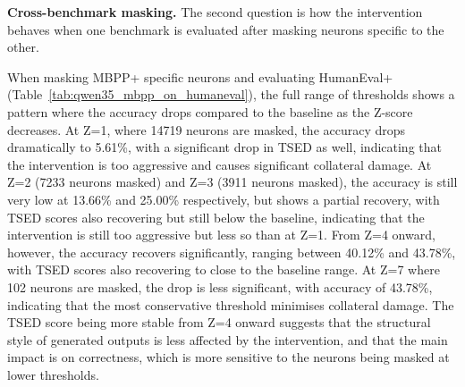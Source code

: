 \documentclass[mscthesis]{usiinfthesis}
\begin{document}
\par\vspace{1em}
\textbf{Cross-benchmark masking.}
The second question is how the intervention behaves when one benchmark is evaluated after masking neurons specific to the other.
\par\vspace{1em}
When masking MBPP+ specific neurons and evaluating HumanEval+ (Table~\ref{tab:qwen35_mbpp_on_humaneval}), 
the full range of thresholds shows a pattern where the accuracy drops compared to the baseline as the Z-score decreases. 
At Z=1, where 14719 neurons are masked, the accuracy drops dramatically to 5.61\%, with a significant drop in TSED as well, 
indicating that the intervention is too aggressive and causes significant collateral damage.
At Z=2 (7233 neurons masked) and Z=3 (3911 neurons masked), the accuracy is still very low at 13.66\% and 25.00\% respectively, 
but shows a partial recovery, with TSED scores also recovering but still below the baseline, indicating that the intervention is still too aggressive but less so than at Z=1.
From Z=4 onward, however, the accuracy recovers significantly, ranging between 40.12\% and 43.78\%, with TSED scores also recovering 
to close to the baseline range.
At Z=7 where 102 neurons are masked, the drop is less significant, with accuracy of 43.78\%, 
indicating that the most conservative threshold minimises collateral damage.
The TSED score being more stable from Z=4 onward suggests that the structural style of generated outputs is less affected by the intervention,
and that the main impact is on correctness, which is more sensitive to the neurons being masked at lower thresholds.

\begin{table}[h]
\centering
\caption{Qwen3.5-2B: HumanEval+ accuracy when masking MBPP+ specific neurons.}
\label{tab:qwen35_mbpp_on_humaneval}
\end{table}
\end{document}
